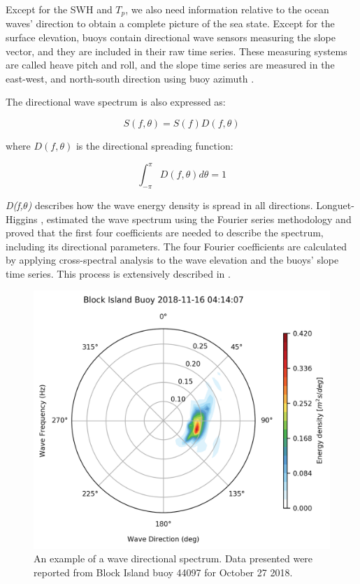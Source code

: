 Except for the SWH and $T_{p}$, we also need information relative to the ocean waves' direction to obtain a complete picture of the sea state. Except for the surface elevation, buoys contain directional wave sensors measuring the slope vector, and they are included in their raw time series. These measuring systems are called heave pitch and roll, and the slope time series are measured in the east-west, and north-south direction using buoy azimuth \cite{Steele1998}. 
 
 
The directional wave spectrum is also expressed as:
 
 \begin{equation}
S(f,\theta) = S(f)D(f,\theta)
\label{eqn:amplitude_freqdir_spectrum2}
\end{equation}

where $D(f,\theta)$ is the directional spreading function:

\begin{equation}
\int_{-\pi}^{\pi} D(f,\theta)d\theta = 1
\label{eqn:directional_spreading}
\end{equation}

\emph{D(f,$\theta$)} describes how the wave energy density is spread in all directions. Longuet-Higgins \cite{longuet1963}, estimated the wave spectrum using the Fourier series methodology and proved that the first four coefficients are needed to describe the spectrum, including its directional parameters. The four Fourier coefficients are calculated by applying cross-spectral analysis to the wave elevation and the buoys' slope time series. This process is extensively described in \citep{Dean1991a, Earle1996, Earle1999, Kuik1988}.

\begin{figure}[H]
\centering
\includegraphics[width=0.85\linewidth]{Figures/Chapter2/dir_spectrum.png}
\caption{An example of a wave directional spectrum. Data presented were reported from Block Island buoy 44097 for October 27 2018.}
\label{fig:dir_spectrum}
\end{figure}

